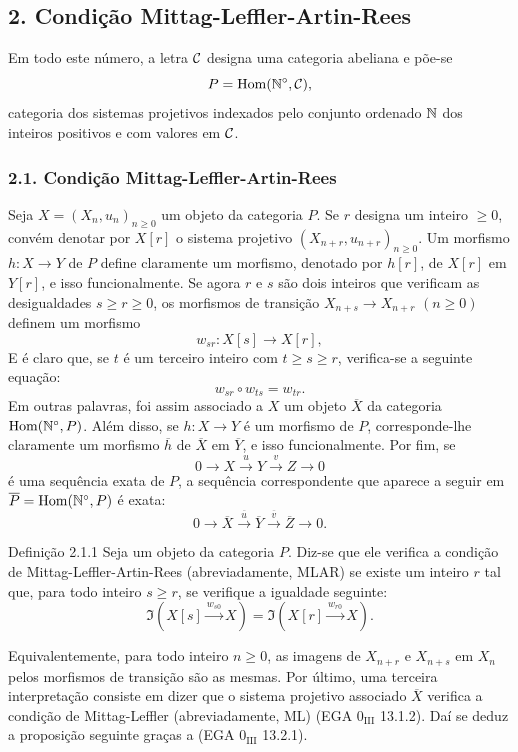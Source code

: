 \subsection*{2. Condição Mittag-Leffler-Artin-Rees}
Em todo este número, a letra $\mathcal C$ designa uma categoria abeliana e põe-se
\[
P=\operatorname{Hom}(\mathbb N^\circ,\mathcal C),
\]
categoria dos sistemas projetivos indexados pelo conjunto ordenado $\mathbb N$ dos inteiros positivos e com valores em $\mathcal C$.

\subsubsection*{2.1. Condição Mittag-Leffler-Artin-Rees}
Seja $X=(X_n,u_n)_{n\ge0}$ um objeto da categoria $P$. Se $r$ designa um inteiro $\ge0$, convém denotar por $X[r]$ o sistema projetivo $(X_{n+r},u_{n+r})_{n\ge0}$. Um morfismo $h:X\to Y$ de $P$ define claramente um morfismo, denotado por $h[r]$, de $X[r]$ em $Y[r]$, e isso funcionalmente. Se agora $r$ e $s$ são dois inteiros que verificam as desigualdades $s\ge r\ge0$, os morfismos de transição $X_{n+s}\to X_{n+r}$ $(n\ge0)$ definem um morfismo
\[
w_{sr}:X[s]\longrightarrow X[r],
\]
E é claro que, se $t$ é um terceiro inteiro com $t\ge s\ge r$, verifica-se a seguinte equação:
\[
w_{sr}\circ w_{ts}=w_{tr}.
\]
Em outras palavras, foi assim associado a $X$ um objeto $\overline X$ da categoria $\operatorname{Hom}(\mathbb N^\circ,P)$. Além disso, se $h:X\to Y$ é um morfismo de $P$, corresponde-lhe claramente um morfismo $\overline h$ de $\overline X$ em $\overline Y$, e isso funcionalmente. Por fim, se
\[
0\longrightarrow X\stackrel{u}{\longrightarrow}Y\stackrel{v}{\longrightarrow}Z\longrightarrow0
\]
é uma sequência exata de $P$, a sequência correspondente que aparece a seguir em $\overline P=\operatorname{Hom}(\mathbb N^\circ,P)$ é exata:
\[
0\longrightarrow\overline X\stackrel{\overline u}{\longrightarrow}\overline Y\stackrel{\overline v}{\longrightarrow}\overline Z\longrightarrow0.
\]

\begin{statement}{Definição 2.1.1}
Seja um objeto da categoria $P$. Diz-se que ele verifica a condição de Mittag-Leffler-Artin-Rees (abreviadamente, MLAR) se existe um inteiro $r$ tal que, para todo inteiro $s\ge r$, se verifique a igualdade seguinte:
\[
\Im(X[s]\xrightarrow{w_{s0}}X)=\Im(X[r]\xrightarrow{w_{r0}}X).
\]
\end{statement}
Equivalentemente, para todo inteiro $n\ge0$, as imagens de $X_{n+r}$ e $X_{n+s}$ em $X_n$ pelos morfismos de transição são as mesmas. Por último, uma terceira interpretação consiste em dizer que o sistema projetivo associado $\overline X$ verifica a condição de Mittag-Leffler (abreviadamente, ML) (EGA $0_{\mathrm{III}}$ 13.1.2). Daí se deduz a proposição seguinte graças a (EGA $0_{\mathrm{III}}$ 13.2.1).

